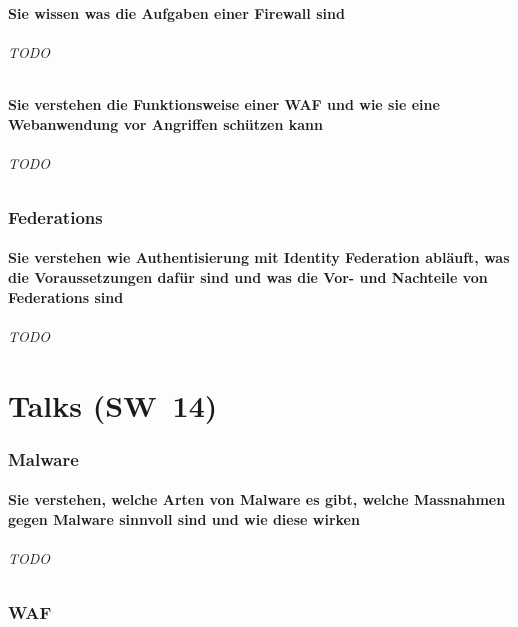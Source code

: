 \documentclass[10pt,a4paper]{article}
\begin{document}
\subsection*{Sie wissen was die Aufgaben einer Firewall sind}
\paragraph*{TODO}
\subsection*{Sie verstehen die Funktionsweise einer WAF und wie sie eine Webanwendung vor Angriffen schützen kann}
\paragraph*{TODO}


\section{Federations}
\subsection*{Sie verstehen wie Authentisierung mit Identity Federation abläuft, was die Voraussetzungen dafür sind und was die Vor- und Nachteile von Federations sind}
\paragraph*{TODO}



\part{Talks (SW~14)}
\section{Malware}
\subsection*{Sie verstehen, welche Arten von Malware es gibt, welche Massnahmen gegen Malware sinnvoll sind und wie diese wirken}
\paragraph*{TODO}

\section{WAF}
\end{document}
